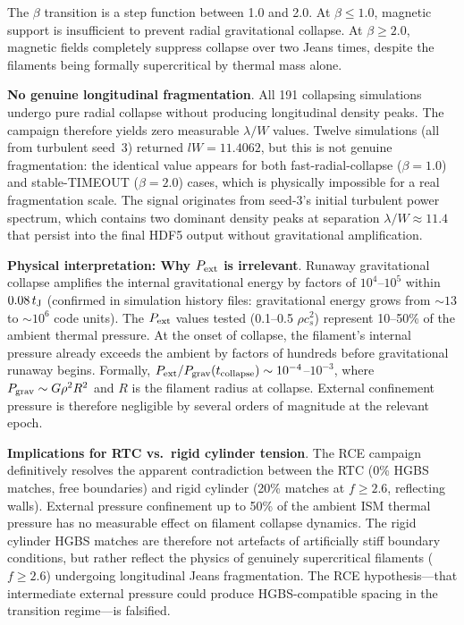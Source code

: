 \documentclass[twocolumn,usenatbib]{mnras}
\begin{document}
The $\beta$ transition is a step function between 1.0 and 2.0. At $\beta \leq 1.0$, magnetic support is insufficient to prevent radial gravitational collapse. At $\beta \geq 2.0$, magnetic fields completely suppress collapse over two Jeans times, despite the filaments being formally supercritical by thermal mass alone.

\textbf{No genuine longitudinal fragmentation}. All 191 collapsing simulations undergo pure radial collapse without producing longitudinal density peaks. The campaign therefore yields zero measurable $\lambda/W$ values. Twelve simulations (all from turbulent seed~3) returned $lW = 11.4062$, but this is not genuine fragmentation: the identical value appears for both fast-radial-collapse ($\beta = 1.0$) and stable-TIMEOUT ($\beta = 2.0$) cases, which is physically impossible for a real fragmentation scale. The signal originates from seed-3's initial turbulent power spectrum, which contains two dominant density peaks at separation $\lambda/W \approx 11.4$ that persist into the final HDF5 output without gravitational amplification.

\textbf{Physical interpretation: Why $P_{\rm ext}$ is irrelevant}. Runaway gravitational collapse amplifies the internal gravitational energy by factors of $10^4$--$10^5$ within $0.08\,t_{\rm J}$ (confirmed in simulation history files: gravitational energy grows from $\sim 13$ to $\sim 10^6$ code units). The $P_{\rm ext}$ values tested (0.1--0.5 $\rho c_s^2$) represent 10--50\% of the ambient thermal pressure. At the onset of collapse, the filament's internal pressure already exceeds the ambient by factors of hundreds before gravitational runaway begins. Formally, $P_{\rm ext} / P_{\rm grav}(t_{\rm collapse}) \sim 10^{-4}$--$10^{-3}$, where $P_{\rm grav} \sim G\rho^2R^2$ and $R$ is the filament radius at collapse. External confinement pressure is therefore negligible by several orders of magnitude at the relevant epoch.

\textbf{Implications for RTC vs.\ rigid cylinder tension}. The RCE campaign definitively resolves the apparent contradiction between the RTC (0\% HGBS matches, free boundaries) and rigid cylinder (20\% matches at $f \geq 2.6$, reflecting walls). External pressure confinement up to 50\% of the ambient ISM thermal pressure has no measurable effect on filament collapse dynamics. The rigid cylinder HGBS matches are therefore not artefacts of artificially stiff boundary conditions, but rather reflect the physics of genuinely supercritical filaments ($f \geq 2.6$) undergoing longitudinal Jeans fragmentation. The RCE hypothesis---that intermediate external pressure could produce HGBS-compatible spacing in the transition regime---is falsified.
\end{document}
